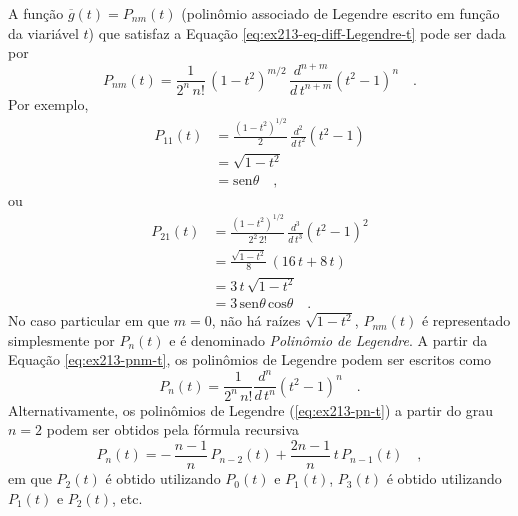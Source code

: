 \documentclass[10pt,a4paper,fleqn]{article}
\begin{document}
A fun\c{c}\~{a}o $\overline{g}(t) = P_{nm}(t)$ (polin\^{o}mio associado de Legendre escrito em fun\c{c}\~{a}o da viari\'{a}vel 
$t$) que satisfaz a Equa\c{c}\~{a}o \ref{eq:ex213-eq-diff-Legendre-t} pode ser dada por
\begin{equation}
P_{nm}(t) = \frac{1}{2^{n} \, n!} \, (1 - t^{2})^{m/2} \,
\frac{d^{n+m}}{d \, t^{n+m}}(t^{2} - 1)^{n} \quad .
\label{eq:ex213-pnm-t}
\end{equation}
Por exemplo,
\begin{equation}
\begin{split}
P_{11}(t) & = \frac{(1 - t^{2})^{1/2}}{2} \, \frac{d^{2}}{d \, t^{2}}(t^{2} - 1) \\
& = \sqrt{1 - t^{2}} \\
& = \text{sen} \theta \quad ,
\end{split}
\label{eq:ex213-p11-t}
\end{equation}
ou
\begin{equation}
\begin{split}
P_{21}(t) & = \frac{(1 - t^{2})^{1/2}}{2^{2} \, 2!} \, \frac{d^{3}}{d \, t^{3}}(t^{2} - 1)^{2} \\
& = \frac{\sqrt{1 - t^{2}}}{8} \, (16 \, t + 8 \, t) \\
& = 3 \, t \, \sqrt{1 - t^{2}} \\
& = 3 \, \text{sen} \theta \, \text{cos} \theta \quad .
\end{split}
\label{eq:ex213-p21-t}
\end{equation}
No caso particular em que $m = 0$, n\~{a}o h\'{a} ra\'{i}zes $\sqrt{1 - t^{2}}$, $P_{nm}(t)$ \'{e} representado 
simplesmente por $P_{n}(t)$ e \'{e} denominado \textit{Polin\^{o}mio de Legendre}. A partir da Equa\c{c}ão \ref{eq:ex213-pnm-t}, 
os polin\^{o}mios de Legendre podem ser escritos como
\begin{equation}
P_{n}(t) = \frac{1}{2^{n} \, n!} \frac{d^{n}}{d \, t^{n}}(t^{2} - 1)^{n} \quad .
\label{eq:ex213-pn-t}
\end{equation}
Alternativamente, os polin\^{o}mios de Legendre (\ref{eq:ex213-pn-t}) a partir do grau $n = 2$ podem ser obtidos pela 
f\'{o}rmula recursiva
\begin{equation}
P_{n}(t) = - \, \frac{n - 1}{n} \, P_{n-2}(t) + \frac{2n - 1}{n} \, t \, P_{n-1}(t) \quad ,
\label{eq:ex213-pn-recursiva}
\end{equation}
em que $P_{2}(t)$ \'{e} obtido utilizando $P_{0}(t)$ e $P_{1}(t)$, $P_{3}(t)$ \'{e} obtido utilizando $P_{1}(t)$ e $P_{2}(t)$, etc.
\end{document}

